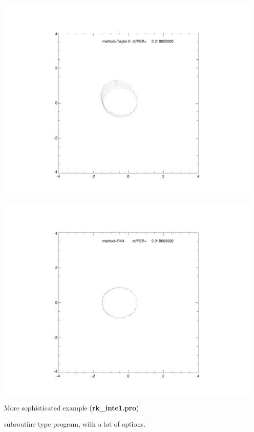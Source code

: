 \documentclass[a4paper,12pt]{article}
\def\black{\color{RGBblack}}
\begin{document}
{{\hspace{8cm} \includegraphics[angle=0,width=0.35\paperwidth]{inte_simple_taylor2.pdf}

\hspace{8cm} \includegraphics[angle=0,width=0.35\paperwidth]{inte_simple_rk4.pdf}



\newpage

\black

{ More sophisticated example ({\bf rk\_inte1.pro}})

\bul subroutine type program, with a lot of options. 

}}
\end{document}
